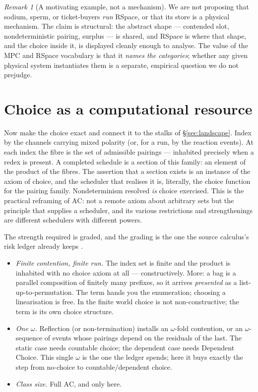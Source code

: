 \documentclass[11pt]{article}
\theoremstyle{definition}
\theoremstyle{plain}
\theoremstyle{remark}
\newtheorem{remark}{Remark}
\begin{document}
\begin{remark}[A motivating example, not a mechanism]
We are not proposing that sodium, sperm, or ticket-buyers \emph{run} RSpace, or that
its store is a physical mechanism. The claim is structural: the abstract shape ---
contended slot, nondeterministic pairing, surplus --- is shared, and RSpace is where
that shape, and the choice inside it, is displayed cleanly enough to analyse. The
value of the MPC and RSpace vocabulary is that it \emph{names the categories};
whether any given physical system instantiates them is a separate, empirical
question we do not prejudge.
\end{remark}

\section{Choice as a computational resource}\label{sec:choice}

Now make the choice exact and connect it to the stalks of \S\ref{sec:landscape}.
Index by the channels carrying mixed polarity (or, for a run, by the reaction
events). At each index the fibre is the set of admissible pairings ---
inhabited precisely when a redex is present. A completed schedule is a section of
this family: an element of the product of the fibres. The assertion that a section
exists is an instance of the axiom of choice, and the scheduler that realises it is,
literally, the choice function for the pairing family. Nondeterminism resolved
\emph{is} choice exercised. This is the practical reframing of $\mathrm{AC}$: not a
remote axiom about arbitrary sets but the principle that supplies a scheduler, and
its various restrictions and strengthenings are different schedulers with different
powers.

The strength required is graded, and the grading is the one the source calculus's
risk ledger already keeps \cite{qcs}.

\begin{itemize}[leftmargin=1.4em]
\item \emph{Finite contention, finite run.} The index set is finite and the product
is inhabited with no choice axiom at all --- constructively. More: a bag is a
parallel composition of finitely many prefixes, so it arrives \emph{presented} as a
list-up-to-permutation. The term hands you the enumeration; choosing a linearisation
is free. In the finite world choice is not non-constructive; the term is its own
choice structure.

\item \emph{One $\omega$.} Reflection (or non-termination) installs an
$\omega$-fold contention, or an $\omega$-sequence of events whose pairings depend on
the residuals of the last. The static case needs countable choice; the dependent case
needs Dependent Choice. This single $\omega$ is the one the ledger spends; here it
buys exactly the step from no-choice to countable/dependent choice.

\item \emph{Class size.} Full $\mathrm{AC}$, and only here.
\end{itemize}
\end{document}
